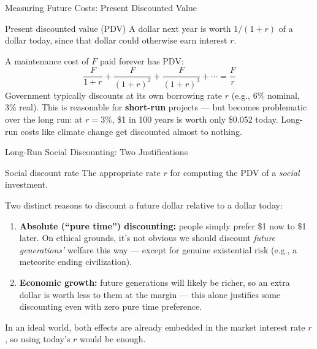 \documentclass[11pt,aspectratio=169]{beamer}
\begin{document}
\begin{frame}{Measuring Future Costs: Present Discounted Value}
  \begin{block}{Present discounted value (PDV)}
    A dollar next year is worth $1/(1+r)$ of a dollar today, since that dollar could otherwise earn interest $r$.
  \end{block}
  A maintenance cost of $F$ paid forever has PDV:
  \[ \frac{F}{1+r} + \frac{F}{(1+r)^2} + \frac{F}{(1+r)^3} + \cdots = \frac{F}{r} \]
  \small Government typically discounts at its own borrowing rate $r$ (e.g., 6\% nominal, 3\% real). This is reasonable for \textbf{short-run} projects --- but becomes problematic over the long run: at $r=3\%$, \$1 in 100 years is worth only \$0.052 today. Long-run costs like climate change get discounted almost to nothing.
\end{frame}

\begin{frame}{Long-Run Social Discounting: Two Justifications}
  \begin{block}{Social discount rate}
    The appropriate rate $r$ for computing the PDV of a \emph{social} investment.
  \end{block}
  Two distinct reasons to discount a future dollar relative to a dollar today:
  \begin{enumerate}
    \item \textbf{Absolute (``pure time'') discounting:} people simply prefer \$1 now to \$1 later. On ethical grounds, it's not obvious we should discount \emph{future generations'} welfare this way --- except for genuine existential risk (e.g., a meteorite ending civilization).
    \item \textbf{Economic growth:} future generations will likely be richer, so an extra dollar is worth less to them at the margin --- this alone justifies some discounting even with zero pure time preference.
  \end{enumerate}
  \small In an ideal world, both effects are already embedded in the market interest rate $r$, so using today's $r$ would be enough.
\end{frame}
\end{document}
